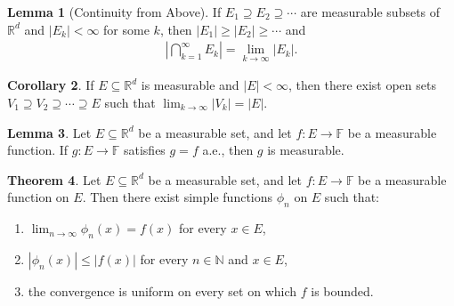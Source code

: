 \documentclass[a4paper,9pt]{extarticle}
\theoremstyle{definition}
\newtheorem{thm}{Theorem}
\newtheorem{lem}[thm]{Lemma}
\newtheorem{cor}[thm]{Corollary}
\begin{document}

\begin{lem}[Continuity from Above]
    If $E_1 \supseteq E_2 \supseteq \cdots$ are measurable subsets of $\mathbb{R}^d$ and $|E_k| < \infty$ for some $k$, then $|E_1| \geq |E_2| \geq \cdots$ and
    \begin{align*}
        \left| \bigcap_{k = 1}^\infty E_k \right| = \lim_{k \to \infty} |E_k|.
    \end{align*}
\end{lem}
\begin{cor}
    If $E \subseteq \mathbb{R}^d$ is measurable and $|E| < \infty$, then there exist open sets $V_1 \supseteq V_2 \supseteq \cdots \supseteq E$ such that $\lim_{k \to \infty} |V_k| = |E|$.
\end{cor}
\begin{lem}
    Let $E \subseteq \mathbb{R}^d$ be a measurable set, and let $f : E \to \mathbb{F}$ be a measurable function. If $g : E \to \mathbb{F}$ satisfies $g = f$ a.e., then $g$ is measurable.
\end{lem}

\begin{thm}
    Let $E \subseteq \mathbb{R}^d$ be a measurable set, and let $f : E \to \mathbb{F}$ be a measurable function on $E$. Then there exist simple functions $\phi_n$ on $E$ such that:
    \begin{enumerate}[itemsep=0ex, label=(\alph*)]
        \item
            $\lim_{n \to \infty} \phi_n(x) = f(x)$ for every $x \in E$,
        \item
            $|\phi_n(x)| \leq |f(x)|$ for every $n \in \mathbb{N}$ and $x \in E$,
        \item
            the convergence is uniform on every set on which $f$ is bounded.
    \end{enumerate}
\end{thm}
\end{document}
